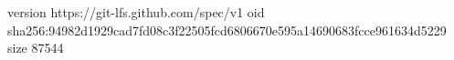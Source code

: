 version https://git-lfs.github.com/spec/v1
oid sha256:94982d1929cad7fd08c3f22505fcd6806670e595a14690683fcce961634d5229
size 87544
